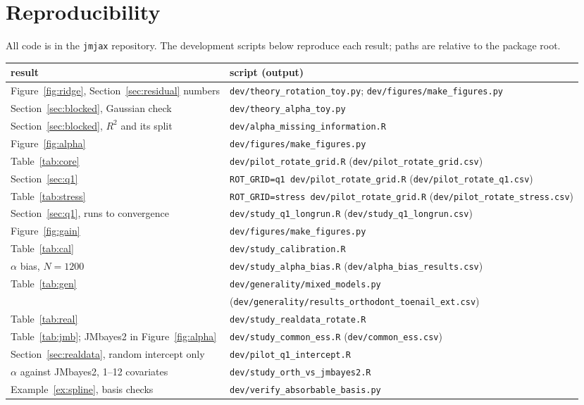 \section{Reproducibility}\label{app:repro}

All code is in the \texttt{jmjax} repository. The development scripts
below reproduce each result; paths are relative to the package root.

\begin{center}
\footnotesize
\begin{tabular}{p{}p{}}
\toprule
result & script (output) \\
\midrule
Figure~\ref{fig:ridge}, Section~\ref{sec:residual} numbers &
\texttt{dev/theory\_rotation\_toy.py}; \texttt{dev/figures/make\_figures.py} \\
Section~\ref{sec:blocked}, Gaussian check & \texttt{dev/theory\_alpha\_toy.py} \\
Section~\ref{sec:blocked}, $R^2$ and its split & \texttt{dev/alpha\_missing\_information.R} \\
Figure~\ref{fig:alpha} & \texttt{dev/figures/make\_figures.py} \\
Table~\ref{tab:core} & \texttt{dev/pilot\_rotate\_grid.R} (\texttt{dev/pilot\_rotate\_grid.csv}) \\
Section~\ref{sec:q1} & \texttt{ROT\_GRID=q1 dev/pilot\_rotate\_grid.R} (\texttt{dev/pilot\_rotate\_q1.csv}) \\
Table~\ref{tab:stress} & \texttt{ROT\_GRID=stress dev/pilot\_rotate\_grid.R} (\texttt{dev/pilot\_rotate\_stress.csv}) \\
Section~\ref{sec:q1}, runs to convergence & \texttt{dev/study\_q1\_longrun.R} (\texttt{dev/study\_q1\_longrun.csv}) \\
Figure~\ref{fig:gain} & \texttt{dev/figures/make\_figures.py} \\
Table~\ref{tab:cal} & \texttt{dev/study\_calibration.R} \\
$\alpha$ bias, $N = 1200$ & \texttt{dev/study\_alpha\_bias.R} (\texttt{dev/alpha\_bias\_results.csv}) \\
Table~\ref{tab:gen} & \texttt{dev/generality/mixed\_models.py} \\
& (\texttt{dev/generality/results\_orthodont\_toenail\_ext.csv}) \\
Table~\ref{tab:real} & \texttt{dev/study\_realdata\_rotate.R} \\
Table~\ref{tab:jmb}; JMbayes2 in Figure~\ref{fig:alpha} & \texttt{dev/study\_common\_ess.R} (\texttt{dev/common\_ess.csv}) \\
Section~\ref{sec:realdata}, random intercept only & \texttt{dev/pilot\_q1\_intercept.R} \\
$\alpha$ against JMbayes2, 1--12 covariates & \texttt{dev/study\_orth\_vs\_jmbayes2.R} \\
Example~\ref{ex:spline}, basis checks & \texttt{dev/verify\_absorbable\_basis.py} \\
\bottomrule
\end{tabular}
\end{center}
